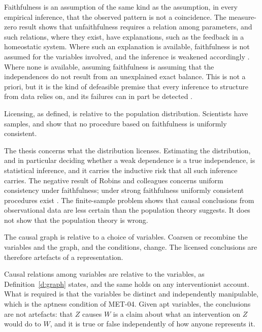 \documentclass{situationist-preprint}
\begin{document}
\begin{reply}
Faithfulness is an assumption of the same kind as the assumption, in every empirical inference, that the observed pattern is not a coincidence. The measure-zero result shows that unfaithfulness requires a relation among parameters, and such relations, where they exist, have explanations, such as the feedback in a homeostatic system. Where such an explanation is available, faithfulness is not assumed for the variables involved, and the inference is weakened accordingly \citep{Weinberger2018}. Where none is available, assuming faithfulness is assuming that the independences do not result from an unexplained exact balance. This is not a priori, but it is the kind of defeasible premise that every inference to structure from data relies on, and its failures can in part be detected \citep{ZhangSpirtes2008}.
\end{reply}

\begin{objection}\label{o:sample}
Licensing, as defined, is relative to the population distribution. Scientists have samples, and \citet{Robins2003} show that no procedure based on faithfulness is uniformly consistent.
\end{objection}

\begin{reply}
The thesis concerns what the distribution licenses. Estimating the distribution, and in particular deciding whether a weak dependence is a true independence, is statistical inference, and it carries the inductive risk that all such inference carries. The negative result of Robins and colleagues concerns uniform consistency under faithfulness; under strong faithfulness uniformly consistent procedures exist \citep{Kalisch2007}. The finite-sample problem shows that causal conclusions from observational data are less certain than the population theory suggests. It does not show that the population theory is wrong.
\end{reply}

\begin{objection}[Variables]
The causal graph is relative to a choice of variables. Coarsen or recombine the variables and the graph, and the conditions, change. The licensed conclusions are therefore artefacts of a representation.
\end{objection}

\begin{reply}
Causal relations among variables are relative to the variables, as Definition~\ref{d:graph} states, and the same holds on any interventionist account. What is required is that the variables be distinct and independently manipulable, which is the aptness condition of MET-04. Given apt variables, the conclusions are not artefacts: that $Z$ causes $W$ is a claim about what an intervention on $Z$ would do to $W$, and it is true or false independently of how anyone represents it.
\end{reply}
\end{document}
